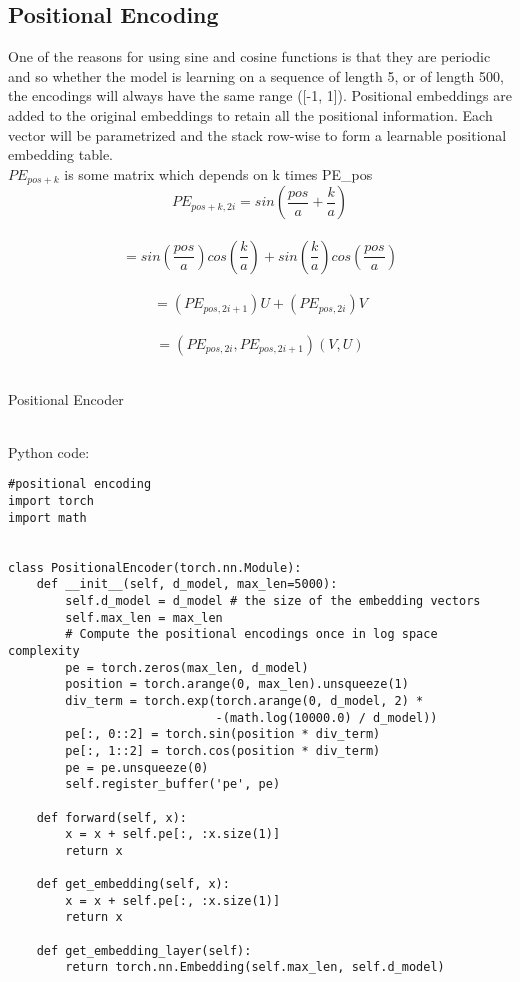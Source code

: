 \documentclass{article}
\begin{document}
\subsection{Positional Encoding}
One of the reasons for using sine and cosine functions is that they are periodic and so whether the model is learning on a sequence of length 5, or of length 500, the encodings will always have the same range ([-1, 1]).  Positional embeddings are added to the original embeddings to retain all the positional information. Each vector will be parametrized and the stack row-wise to form a learnable positional embedding table.
\\
$PE_{pos+k}$ is some matrix which depends on k times PE_{pos}\\
$$PE_{pos+k, 2i} = sin(\frac{pos}{a}+\frac{k}{a})$$\\
$$ =sin(\frac{pos}{a})cos(\frac{k}{a})+sin(\frac{k}{a})cos(\frac{pos}{a})$$\\
$$ =(PE_{pos,2i+1})U+(PE_{pos,2i})V$$\\
$$ =(PE_{pos,2i},PE_{pos,2i+1})(V,U)$$\\

\begin{algorithm}
\caption{Positional Encoder}
\begin{algorithmic}
\EndFor
\end{algorithmic}
\end{algorithm}


\\Python code:


\begin{lstlisting}
#positional encoding
import torch
import math


class PositionalEncoder(torch.nn.Module):
    def __init__(self, d_model, max_len=5000):
        self.d_model = d_model # the size of the embedding vectors
        self.max_len = max_len
        # Compute the positional encodings once in log space complexity
        pe = torch.zeros(max_len, d_model)
        position = torch.arange(0, max_len).unsqueeze(1)
        div_term = torch.exp(torch.arange(0, d_model, 2) *
                             -(math.log(10000.0) / d_model))
        pe[:, 0::2] = torch.sin(position * div_term)
        pe[:, 1::2] = torch.cos(position * div_term)
        pe = pe.unsqueeze(0)
        self.register_buffer('pe', pe)

    def forward(self, x):
        x = x + self.pe[:, :x.size(1)]
        return x

    def get_embedding(self, x):
        x = x + self.pe[:, :x.size(1)]
        return x

    def get_embedding_layer(self):
        return torch.nn.Embedding(self.max_len, self.d_model)

\end{lstlisting}
\clearpage
\end{document}

